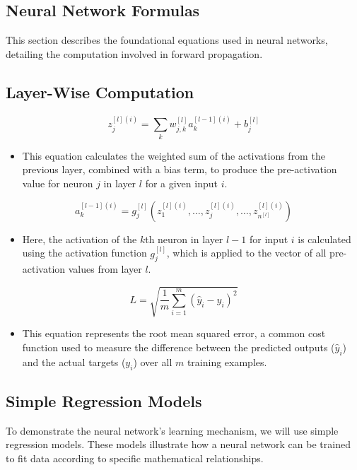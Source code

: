     \subsection{Neural Network Formulas}
    This section describes the foundational equations used in neural networks, detailing the computation involved in forward propagation.

    \subsection{Layer-Wise Computation}
    \begin{equation}
        z_{j}^{[l](i)} = \sum_{k} w_{j,k}^{[l]} a_{k}^{[l-1](i)} + b_{j}^{[l]} 
    \end{equation}
    \begin{itemize}
        \item This equation calculates the weighted sum of the activations from the previous layer, combined with a bias term, to produce the pre-activation value for neuron \(j\) in layer \(l\) for a given input \(i\).
    \end{itemize}

    \begin{equation}
        a_{k}^{[l-1](i)} = g_{j}^{[l]}\left(z_{1}^{[l](i)}, \dots, z_{j}^{[l](i)}, \dots, z_{n^{[l]}}^{[l](i)}\right)
    \end{equation}
    \begin{itemize}
        \item Here, the activation of the \(k\)th neuron in layer \(l-1\) for input \(i\) is calculated using the activation function \(g_{j}^{[l]}\), which is applied to the vector of all pre-activation values from layer \(l\).
    \end{itemize}

    \begin{equation}
        L = \sqrt{\frac{1}{m} \sum_{i=1}^m (\hat{y}_i - y_i)^2} 
    \end{equation}
    \begin{itemize}
        \item This equation represents the root mean squared error, a common cost function used to measure the difference between the predicted outputs (\(\hat{y}_i\)) and the actual targets (\(y_i\)) over all \(m\) training examples.
    \end{itemize}

    \subsection{Simple Regression Models}
    To demonstrate the neural network's learning mechanism, we will use simple regression models. These models illustrate how a neural network can be trained to fit data according to specific mathematical relationships.

